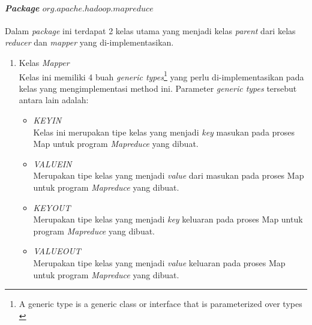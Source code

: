 \paragraph{\textit{Package} $org.apache.hadoop.mapreduce$}
Dalam \textit{package} ini terdapat 2 kelas utama yang menjadi kelas \textit{parent} dari kelas \textit{reducer} dan \textit{mapper} yang di-implementasikan.
\begin{enumerate}
	\item{Kelas \textit{Mapper}}\\
	Kelas ini memiliki 4 buah \textit{generic types}\footnote{A generic type is a generic class or interface that is parameterized over types \cite{GenericTypeJavaOracle}} yang perlu di-implementasikan pada kelas yang mengimplementasi method ini. Parameter \textit{generic types} tersebut antara lain adalah:
	\begin{itemize}
		\item{\textit{KEYIN}}\\
		Kelas ini merupakan tipe kelas yang menjadi \textit{key} masukan pada proses Map untuk program \textit{Mapreduce} yang dibuat.		
		\item{\textit{VALUEIN}}\\
		Merupakan tipe kelas yang menjadi \textit{value} dari masukan pada proses Map untuk program \textit{Mapreduce} yang dibuat.
		\item{\textit{KEYOUT}}\\
		Merupakan tipe kelas yang menjadi \textit{key} keluaran pada proses Map untuk program \textit{Mapreduce} yang dibuat.
		\item{\textit{VALUEOUT}}\\
		Merupakan tipe kelas yang menjadi \textit{value} keluaran pada proses Map untuk program \textit{Mapreduce} yang dibuat.
	\end{itemize}
	

\end{enumerate}
